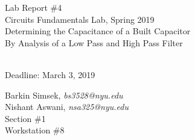 \documentclass[journal]{IEEEtran}
\begin{document}
\begin{titlepage}
    {\centering
        \vspace*{20em}
        {
        \huge 
        \begin{spacing}{1.5}
            Lab Report \#4 
            \\
            Circuits Fundamentals Lab, Spring 2019
            \bigskip
            \Large
            \\
            Determining the Capacitance of a Built Capacitor\\
            By Analysis of a Low Pass and High Pass Filter
  
            \\
            \bigskip
            Deadline: March 3, 2019 
        \end{spacing}

        }
        
    }
    \vfill
    
    {
    \large
    
    \begin{spacing}{1.5}
    \noindent Barkin Simsek, {\it {bs3528@nyu.edu}} 
    \\
    Nishant Aswani, {\it {nsa325@nyu.edu}}
    \\
    Section \#1%
    \\
    Workstation \#8%
    \end{spacing}
    }


\end{titlepage}
{}
\setcounter{page}{1}




%
{}

\end{document}
